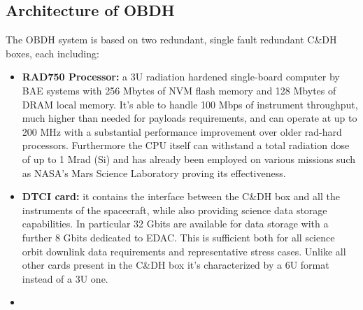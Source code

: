 \subsection{Architecture of OBDH}
\label{subsec:OBDH_architecture}

The OBDH system is based on two redundant, single fault redundant C\&DH boxes, each including:
\begin{itemize}
    \item \textbf{RAD750 Processor:} a 3U radiation hardened single-board computer by BAE systems with 256 Mbytes of NVM flash memory and 128 Mbytes of DRAM local memory. \cite{juno_sito} It's able to handle 100 Mbps of instrument throughput, much higher than needed for payloads requirements, and can operate at up to 200 MHz with a substantial performance improvement over older rad-hard processors. Furthermore the CPU itself can withstand a total radiation dose of up to 1 Mrad (Si) and has already been employed on various missions such as NASA's Mars Science Laboratory proving its effectiveness. \cite{RAD750} \cite{batterie}
    \item \textbf{DTCI card:} it contains the interface between the C\&DH box and all the instruments of the spacecraft, while also providing science data storage capabilities. In particular 32 Gbits are available for data storage with a further 8 Gbits dedicated to EDAC. This is sufficient both for all science orbit downlink data requirements and representative stress cases. Unlike all other cards present in the C\&DH box it's characterized by a 6U format instead of a 3U one. \cite{juno_sito}
    \item 
\end{itemize} 